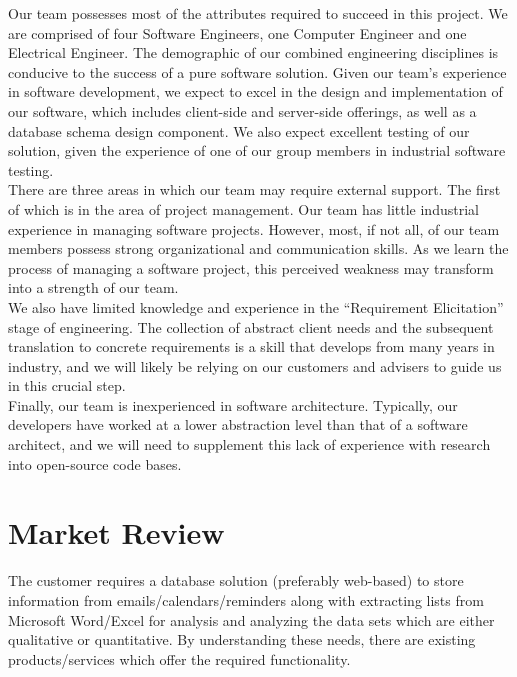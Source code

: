 \documentclass[11pt]{article}
\begin{document}
Our team possesses most of the attributes required to succeed in this project. We are comprised of four Software Engineers, one Computer Engineer and one Electrical Engineer. The demographic of our combined engineering disciplines is conducive to the success of a pure software solution. Given our team's experience in software development, we expect to excel in the design and implementation of our software, which includes client-side and server-side offerings, as well as a database schema design component. We also expect excellent testing of our solution, given the experience of one of our group members in industrial software testing. \\

There are three areas in which our team may require external support. The first of which is in the area of project management. Our team has little industrial experience in managing software projects. However, most, if not all, of our team members possess strong organizational and communication skills. As we learn the process of managing a software project, this perceived weakness may transform into a strength of our team.  \\

We also have limited knowledge and experience in the “Requirement Elicitation” stage of engineering. The collection of abstract client needs and the subsequent translation to concrete requirements is a skill that develops from many years in industry, and we will likely be relying on our customers and advisers to guide us in this crucial step.  \\

Finally, our team is inexperienced in software architecture. Typically, our developers have worked at a lower abstraction level than that of a software architect, and we will need to supplement this lack of experience with research into open-source code bases. \\

\newpage

\section{Market Review}

The customer requires a database solution (preferably web-based) to store information from emails/calendars/reminders along with extracting lists from Microsoft Word/Excel for analysis and analyzing the data sets which are either qualitative or quantitative. By understanding these needs, there are existing products/services which offer the required functionality. \\
\end{document}
